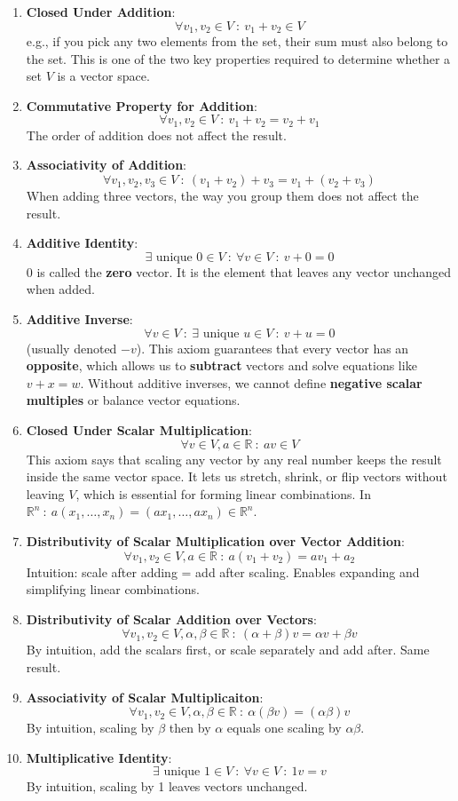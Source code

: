 \documentclass[10pt]{article}
\begin{document}
\begin{enumerate}
	\item \textbf{Closed Under Addition}: 
    \[\forall v_1, v_2 \in V \::\: v_1 + v_2 \in V\]
    e.g., if you pick any two elements from the set, their sum must also belong to the set.  This is one of the two key properties required to determine whether a set $V$ is a vector space.
	\item \textbf{Commutative Property for Addition}: 
    \[\forall v_1, v_2 \in V \::\: v_1 + v_2 = v_2 + v_1\]
    The order of addition does not affect the result.
	\item \textbf{Associativity of Addition}: 
    \[\forall v_1, v_2, v_3 \in V \::\: (v_1 + v_2) + v_3 = v_1 + (v_2 + v_3)\]
    When adding three vectors, the way you group them does not affect the result.
	\item \textbf{Additive Identity}: 
    \[\exists \text{ unique } 0 \in V \::\: \forall v \in V \::\: v + 0 = 0\]
    $0$ is called the \textbf{zero} vector.  It is the element that leaves any vector unchanged when added.
	\item \textbf{Additive Inverse}: 
    \[\forall v \in V \::\: \exists \text{ unique } u \in V \::\: v + u = 0\]
    (usually denoted $-v$).  This axiom guarantees that every vector has an \textbf{opposite}, which allows us to \textbf{subtract} vectors and solve equations like $v + x = w$.  Without additive inverses, we cannot define \textbf{negative scalar multiples} or balance vector equations.
	\item \textbf{Closed Under Scalar Multiplication}: 
    \[\forall v \in V, a \in \mathbb{R} \::\: av \in V\]
    This axiom says that scaling any vector by any real number keeps the result inside the same vector space.  It lets us stretch, shrink, or flip vectors without leaving $V$, which is essential for forming linear combinations.  In $\mathbb{R}^n \::\: a(x_1, \dots, x_n) = (ax_1, \dots, ax_n) \in \mathbb{R}^n$.
	\item \textbf{Distributivity of Scalar Multiplication over Vector Addition}: 
    \[\forall v_1, v_2 \in V, a \in \mathbb{R} \::\: a(v_1 + v_2) = av_1 + a_2\]
    Intuition: scale after adding = add after scaling.  Enables expanding and simplifying linear combinations.
    \item \textbf{Distributivity of Scalar Addition over Vectors}: 
    \[\forall v_1, v_2 \in V, \alpha, \beta \in \mathbb{R} \::\: (\alpha + \beta)v = \alpha v + \beta v\]
    By intuition, add the scalars first, or scale separately and add after.  Same result.
	\item \textbf{Associativity of Scalar Multiplicaiton}: 
    \[\forall v_1, v_2 \in V, \alpha, \beta \in \mathbb{R} \::\: \alpha(\beta v) = (\alpha \beta) v\]
    By intuition, scaling by $\beta$ then by $\alpha$ equals one scaling by $\alpha \beta$.
	\item \textbf{Multiplicative Identity}: 
    \[\exists \text{ unique } 1 \in V \::\: \forall v \in V \::\: 1v = v\]
    By intuition, scaling by 1 leaves vectors unchanged.
\end{enumerate}
\end{document}
